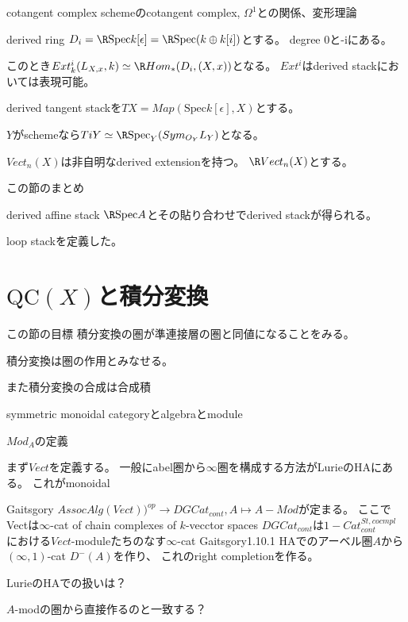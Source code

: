 \documentclass[dvipdfmx]{beamer}
\newcommand{\QC}{\mathrm{QC}}
\newcommand{\spec}{\mathrm{Spec}}
\begin{document}
\begin{frame}{cotangent complex}
schemeのcotangent complex, $\Omega^1$との関係、変形理論

derived ring $D_i=\R \spec k[\epsilon]=\R \spec (k\oplus k[i])$とする。
degree 0と-iにある。

このとき$Ext^i_k(L_{X,x},k)\simeq\R Hom_*(D_i,(X,x))$となる。
$Ext^i$はderived stackにおいては表現可能。

derived tangent stackを$TX=Map(\spec k[\epsilon], X)$とする。

$Y$がschemeなら$TiY\simeq \R \spec_Y(Sym_{O_Y}L_Y)$となる。

$Vect_n(X)$は非自明なderived extensionを持つ。
$\R Vect_n(X)$とする。
\end{frame}

\begin{frame}{この節のまとめ}

derived affine stack $\R \spec A$とその貼り合わせでderived stackが得られる。

loop stackを定義した。
\end{frame}

\section{$\QC(X)$と積分変換}

\begin{frame}{この節の目標}
積分変換の圏が準連接層の圏と同値になることをみる。

積分変換は圏の作用とみなせる。

また積分変換の合成は合成積
\end{frame}

\begin{frame}
symmetric monoidal categoryとalgebraとmodule
\end{frame}

\begin{frame}{$Mod_A$の定義}

まず$Vect$を定義する。
一般にabel圏から$\infty$圏を構成する方法がLurieのHAにある。
これがmonoidal

Gaitsgory
$AssocAlg(Vect))^{op} \to DGCat_{cont}, A \mapsto A-Mod$が定まる。
ここでVectは$\infty$-cat of chain complexes of $k$-vecctor spaces
$DGCat_{cont}$は$1-Cat^{St, cocmpl}_{cont}$における$Vect$-moduleたちのなす$\infty$-cat
Gaitsgory1.10.1
HAでのアーベル圏$A$から$(\infty,1)$-cat $D^-(A)$を作り、
これのright completionを作る。

LurieのHAでの扱いは？

$A$-modの圏から直接作るのと一致する？
\end{frame}
\end{document}
